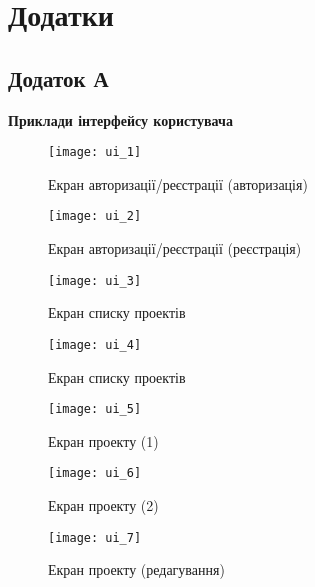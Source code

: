 \setcounter{chapter}{1}
\setcounter{figure}{0}
\renewcommand\thechapter{\Alph{chapter}}

\chapter*{Додатки}

\centeredsection

\section*{Додаток А}
\begin{center}
	\bfseries Приклади інтерфейсу користувача
\end{center}

\begin{figure}[H]
	\centering
	\texttt{[image: ui\_1]}
	\caption{Екран авторизації/реєстрації (авторизація)}
	\label{scr_ui_auth}
\end{figure}

\begin{figure}[H]
	\centering
	\texttt{[image: ui\_2]}
	\caption{Екран авторизації/реєстрації (реєстрація)}
	\label{scr_ui_signup}
\end{figure}

\begin{figure}[H]
	\centering
	\texttt{[image: ui\_3]}
	\caption{Екран списку проектів}
	\label{scr_ui_projects_list}
\end{figure}

\begin{figure}[H]
	\centering
	\texttt{[image: ui\_4]}
	\caption{Екран списку проектів}
	\label{scr_ui_project_creation}
\end{figure}

\begin{figure}[H]
	\centering
	\texttt{[image: ui\_5]}
	\caption{Екран проекту (1)}
	\label{scr_ui_project_1}
\end{figure}

\begin{figure}[H]
	\centering
	\texttt{[image: ui\_6]}
	\caption{Екран проекту (2)}
	\label{scr_ui_project_2}
\end{figure}

\begin{figure}[H]
	\centering
	\texttt{[image: ui\_7]}
	\caption{Екран проекту (редагування)}
	\label{scr_ui_project_edit}
\end{figure}

